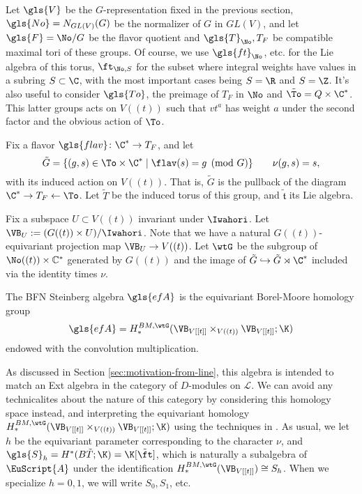 Let $\gls{V}$ be the $G$-representation fixed in the previous section, 
$\gls{No}=N_{GL(V)}(G)$ be the normalizer of $G$ in $GL(V)$, and let
$\gls{F}=\No/G$ be the flavor quotient and $\gls{T}_\No,T_{F}$ be compatible maximal tori of
these groups.  
Of course, we use $\gls{ft}_{\No}$, etc. for the Lie algebra of this
torus, $\ft_{\No,S}$ for the subset where integral weights have
values in a subring $S\subset \C$, with the most important cases being
$S=\R$ and $S=\Z$.    It's also useful to consider $\gls{To}$, the preimage of
$T_F$ in $\No$ and $\tilde{\To}=Q\times \C^*$.  This latter groups acts on $V((t))$
such that $vt^a$ has weight $a$ under the second factor and the
obvious action of $\To$.

Fix a flavor $\gls{flav}\colon \C^*\to T_F$, and let 
\[\tilde{G} =\{(g,s)\in \To\times \C^* \mid \flav(s)=g\pmod G\}\qquad
  \nu(g,s)=s,\]
with its induced action on $V((t))$.  
That is, $\tilde{G}$ is the pullback of the diagram $\C^*\to T_F \leftarrow
\To$. Let $\tilde{T}$ be the induced torus of this group, and
$\tilde{\mathfrak{t}}$ its Lie algebra. 

Fix a subspace $U\subset V((t))$ invariant under $\Iwahori$.  
Let $\VB_U:=(G((t)) \times U)/\Iwahori$.  Note that we have a
natural $G((t))$-equivariant projection map $\VB_U\to V((t))$. 
Let
$\wtG$ be the subgroup of $\No((t))\times
\mathbb{C}^*$ generated by $G((t))$ and the image of
$\tilde{G}\hookrightarrow \tilde{G}\rtimes \C^*$ included via the
identity times $\nu$.  

\begin{definition} The BFN Steinberg algebra $\gls{efA}$ is the equivariant Borel-Moore homology group
   \[\gls{efA}=H_*^{BM, \wtG}(\VB_{V[[t]]}\times_{V((t))}\VB_{V[[t]]};\K)\] endowed with the convolution multiplication.  
 \end{definition}
 As discussed in Section \ref{sec:motivation-from-line}, this algebra
is intended to match an Ext algebra in the category of $D$-modules on
$\mathcal{L}$.  We can avoid any technicalites about the nature of
this category by considering this
homology space instead, and interpreting the equivariant homology $H_*^{BM,
  \wtG}(\VB_{V[[t]]}\times_{V((t))}\VB_{V[[t]]};\K)$ using the techniques in \cite[\S 2(ii)]{BFN}. 
  As usual, we let $h$ be
the equivariant parameter corresponding to the character $\nu$, and $\gls{S}_h=H^*(B\tilde{T};\K)=\K[\tilde{\ft}]$, which is naturally a subalgebra of $\EuScript{A}$ under the identification $H^{BM,\wtG}_*(\VB_{V[[t]]})\cong S_h$.  When we specialize $h=0,1$, we will write $S_0,S_1$, etc.



